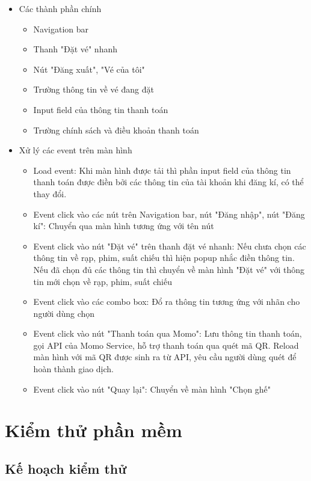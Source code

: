 \documentclass[a4paper, 12pt]{article}
\begin{document}
\begin{itemize}
	\item Các thành phần chính
	\begin{itemize}
		\item Navigation bar
		\item Thanh "Đặt vé" nhanh
		\item Nút "Đăng xuất", "Vé của tôi"
		\item Trường thông tin về vé đang đặt
		\item Input field của thông tin thanh toán
		\item Trường chính sách và điều khoản thanh toán
	\end{itemize}

	\item Xử lý các event trên màn hình
	\begin{itemize}
		\item Load event: Khi màn hình được tải thì phần input field của thông tin thanh toán được điền bởi các thông tin của tài khoản khi đăng kí, có thể thay đổi.
		\item Event click vào các nút trên Navigation bar, nút "Đăng nhập", nút "Đăng kí": Chuyển qua màn hình tương ứng với tên nút
		\item Event click vào nút "Đặt vé" trên thanh đặt vé nhanh: Nếu chưa chọn các thông tin về rạp, phim, suất chiếu thì hiện popup nhắc điền thông tin. Nếu đã chọn đủ các thông tin thì chuyển về màn hình "Đặt vé" với thông tin mới chọn về rạp, phim, suất chiếu
		\item Event click vào các combo box: Đổ ra thông tin tương ứng với nhãn cho người dùng chọn
		\item Event click vào nút "Thanh toán qua Momo": Lưu thông tin thanh toán, gọi API của Momo Service, hỗ trợ thanh toán qua quét mã QR. Reload màn hình với mã QR được sinh ra từ API, yêu cầu người dùng quét để hoàn thành giao dịch.
		\item Event click vào nút "Quay lại": Chuyển về màn hình "Chọn ghế"
	\end{itemize}
\end{itemize}

\clearpage

\section{Kiểm thử phần mềm}

\subsection{Kế hoạch kiểm thử}
\end{document}
